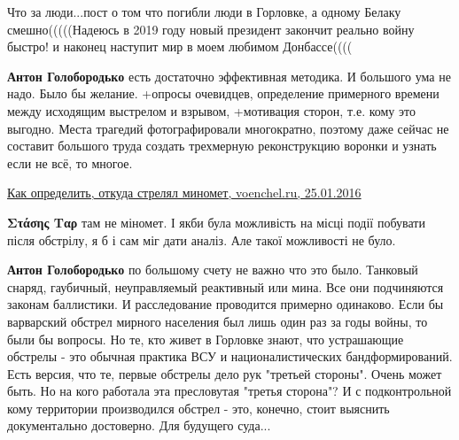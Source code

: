 \begin{itemize}
\begin{itemize}
Что за люди...пост о том что погибли люди в Горловке, а одному Белаку
смешно(((((Надеюсь в 2019 году новый президент закончит реально войну быстро! и
наконец наступит мир в моем любимом Донбассе((((


 
\textbf{Антон Голобородько} есть достаточно эффективная методика. И большого
ума не надо. Было бы желание. +опросы очевидцев, определение примерного времени
между исходящим выстрелом и взрывом, +мотивация сторон, т.е. кому это выгодно.
Места трагедий фотографировали многократно, поэтому даже сейчас не составит
большого труда создать трехмерную реконструкцию воронки и узнать если не всё,
то многое.

\href{http://voenchel.ru/index.php?newsid=2647}{%
Как определить, откуда стрелял миномет, voenchel.ru, 25.01.2016%
}

 
\textbf{Στάσης Ταρ} там не міномет. І якби була можливість на місці події
побувати після обстрілу, я б і сам міг дати аналіз. Але такої можливості не
було.

 
\textbf{Антон Голобородько} по большому счету не важно что это было. Танковый
снаряд, гаубичный, неуправляемый реактивный или мина. Все они подчиняются
законам баллистики. И расследование проводится примерно одинаково. Если бы
варварский обстрел мирного населения был лишь один раз за годы войны, то были
бы вопросы. Но те, кто живет в Горловке знают, что устрашающие обстрелы - это
обычная практика ВСУ и националистических бандформирований. Есть версия, что
те, первые обстрелы дело рук "третьей стороны". Очень может быть. Но на кого
работала эта пресловутая "третья сторона"? И с подконтрольной кому территории
производился обстрел - это, конечно, стоит выяснить документально достоверно.
Для будущего суда...


\end{itemize}
\end{itemize}
